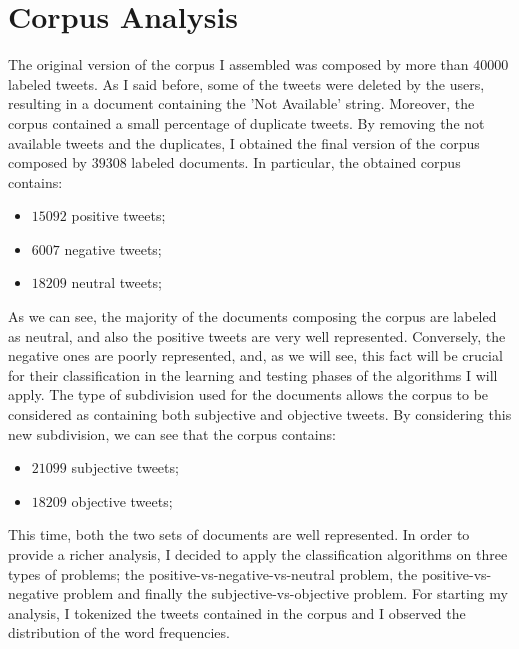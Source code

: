 \documentclass[11pt,twocolumn]{article}
\begin{document}
    \section{Corpus Analysis} %
    \label{sec:corpus_analysis}
        The original version of the corpus I assembled was composed by more than $40000$ labeled tweets.
        As I said before, some of the tweets were deleted by the users, resulting in a document
        containing the 'Not Available' string. Moreover, the corpus contained a small percentage of
        duplicate tweets. By removing the not available tweets and the duplicates, I obtained the final
        version of the corpus composed by $39308$ labeled documents. In particular, the obtained corpus
        contains:

        \begin{itemize}
            \item $15092$ positive tweets;
            \item $6007$ negative tweets;
            \item $18209$ neutral tweets;
        \end{itemize}

        \noindent
        As we can see, the majority of the documents composing the corpus are labeled as neutral, and also
        the positive tweets are very well represented. Conversely, the negative ones are poorly
        represented, and, as we will see, this fact will be crucial for their classification in the
        learning and testing phases of the algorithms I will apply. The type of subdivision used for the
        documents allows the corpus to be considered as containing both subjective and objective tweets.
        By considering this new subdivision, we can see that the corpus contains:

        \begin{itemize}
            \item $21099$ subjective tweets;
            \item $18209$ objective tweets;
        \end{itemize}

        This time, both the two sets of documents are well represented. In order to provide a richer
        analysis, I decided to apply the classification algorithms on three types of problems; the
        positive-vs-negative-vs-neutral problem, the positive-vs-negative problem and finally the
        subjective-vs-objective problem. For starting my analysis, I tokenized the tweets contained in the
        corpus and I observed the distribution of the word frequencies.
\end{document}
